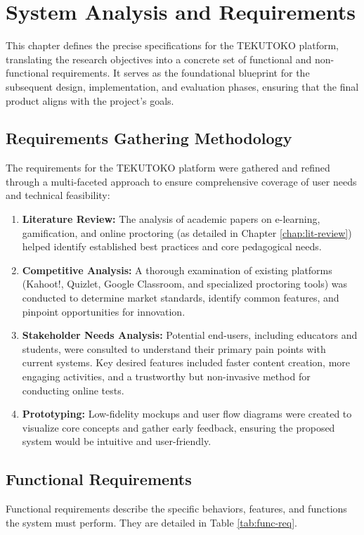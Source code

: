 \chapter{System Analysis and Requirements}
\label{chap:requirements}

This chapter defines the precise specifications for the TEKUTOKO platform, translating the research objectives into a concrete set of functional and non-functional requirements. It serves as the foundational blueprint for the subsequent design, implementation, and evaluation phases, ensuring that the final product aligns with the project's goals.

\section{Requirements Gathering Methodology}
\label{sec:req-gathering}
The requirements for the TEKUTOKO platform were gathered and refined through a multi-faceted approach to ensure comprehensive coverage of user needs and technical feasibility:
\begin{enumerate}
    \item \textbf{Literature Review:} The analysis of academic papers on e-learning, gamification, and online proctoring (as detailed in Chapter \ref{chap:lit-review}) helped identify established best practices and core pedagogical needs.
    \item \textbf{Competitive Analysis:} A thorough examination of existing platforms (Kahoot!, Quizlet, Google Classroom, and specialized proctoring tools) was conducted to determine market standards, identify common features, and pinpoint opportunities for innovation.
    \item \textbf{Stakeholder Needs Analysis:} Potential end-users, including educators and students, were consulted to understand their primary pain points with current systems. Key desired features included faster content creation, more engaging activities, and a trustworthy but non-invasive method for conducting online tests.
    \item \textbf{Prototyping:} Low-fidelity mockups and user flow diagrams were created to visualize core concepts and gather early feedback, ensuring the proposed system would be intuitive and user-friendly.
\end{enumerate}

\section{Functional Requirements}
\label{sec:func-req}
Functional requirements describe the specific behaviors, features, and functions the system must perform. They are detailed in Table \ref{tab:func-req}.

